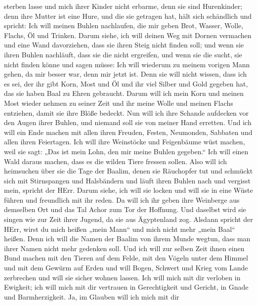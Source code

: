 sterben lasse  und mich ihrer Kinder nicht erbarme, denn sie
sind Hurenkinder;  denn ihre Mutter ist eine Hure, und die
sie getragen hat, hält sich schändlich und spricht: Ich will meinen
Buhlen nachlaufen, die mir geben Brot, Wasser, Wolle, Flachs, Öl und
Trinken.  Darum siehe, ich will deinen Weg mit Dornen
vermachen und eine Wand davorziehen, dass sie ihren Steig nicht finden
soll;  und wenn sie ihren Buhlen nachläuft, dass sie die
nicht ergreifen, und wenn sie die sucht, sie nicht finden könne und
sagen müsse: Ich will wiederum zu meinem vorigen Mann gehen, da mir
besser war, denn mir jetzt ist.  Denn sie will nicht
wissen, dass ich es sei, der ihr gibt Korn, Most und Öl und ihr viel
Silber und Gold gegeben hat, das sie haben Baal zu Ehren gebraucht.
 Darum will ich mein Korn und meinen Most wieder nehmen zu
seiner Zeit und ihr meine Wolle und meinen Flachs entziehen, damit sie
ihre Blöße bedeckt.  Nun will ich ihre Schande aufdecken
vor den Augen ihrer Buhlen, und niemand soll sie von meiner Hand
erretten.  Und ich will ein Ende machen mit allen ihren
Freuden, Festen, Neumonden, Sabbaten und allen ihren Feiertagen.
 Ich will ihre Weinstöcke und Feigenbäume wüst machen, weil
sie sagt: „Das ist mein Lohn, den mir meine Buhlen gegeben.`` Ich will
einen Wald daraus machen, dass es die wilden Tiere fressen sollen.
 Also will ich heimsuchen über sie die Tage der Baalim,
denen sie Räuchopfer tut und schmückt sich mit Stirnspangen und
Halsbändern und läuft ihren Buhlen nach und vergisst mein, spricht der
HErr.  Darum siehe, ich will sie locken und will sie in
eine Wüste führen und freundlich mit ihr reden.  Da will
ich ihr geben ihre Weinberge aus demselben Ort und das Tal Achor zum Tor
der Hoffnung. Und daselbst wird sie singen wie zur Zeit ihrer Jugend, da
sie aus Ägyptenland zog.  Alsdann spricht der HErr, wirst
du mich heißen „mein Mann`` und mich nicht mehr „mein Baal`` heißen.
 Denn ich will die Namen der Baalim von ihrem Munde wegtun,
dass man ihrer Namen nicht mehr gedenken soll.  Und ich
will zur selben Zeit ihnen einen Bund machen mit den Tieren auf dem
Felde, mit den Vögeln unter dem Himmel und mit dem Gewürm auf Erden und
will Bogen, Schwert und Krieg vom Lande zerbrechen und will sie sicher
wohnen lassen.  Ich will mich mit dir verloben in Ewigkeit;
ich will mich mit dir vertrauen in Gerechtigkeit und Gericht, in Gnade
und Barmherzigkeit.  Ja, im Glauben will ich mich mit dir
